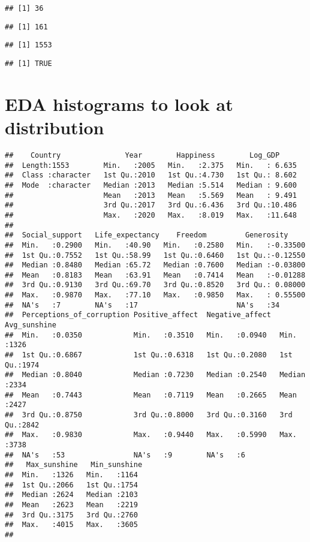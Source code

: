 \documentclass[
]{article}
\begin{document}
\begin{verbatim}
## [1] 36
\end{verbatim}

\begin{verbatim}
## [1] 161
\end{verbatim}

\begin{verbatim}
## [1] 1553
\end{verbatim}

\begin{verbatim}
## [1] TRUE
\end{verbatim}

\hypertarget{eda-histograms-to-look-at-distribution}{%
\section{EDA histograms to look at
distribution}\label{eda-histograms-to-look-at-distribution}}

\begin{verbatim}
##    Country               Year        Happiness        Log_GDP      
##  Length:1553        Min.   :2005   Min.   :2.375   Min.   : 6.635  
##  Class :character   1st Qu.:2010   1st Qu.:4.730   1st Qu.: 8.602  
##  Mode  :character   Median :2013   Median :5.514   Median : 9.600  
##                     Mean   :2013   Mean   :5.569   Mean   : 9.491  
##                     3rd Qu.:2017   3rd Qu.:6.436   3rd Qu.:10.486  
##                     Max.   :2020   Max.   :8.019   Max.   :11.648  
##                                                                    
##  Social_support   Life_expectancy    Freedom         Generosity      
##  Min.   :0.2900   Min.   :40.90   Min.   :0.2580   Min.   :-0.33500  
##  1st Qu.:0.7552   1st Qu.:58.99   1st Qu.:0.6460   1st Qu.:-0.12550  
##  Median :0.8480   Median :65.72   Median :0.7600   Median :-0.03800  
##  Mean   :0.8183   Mean   :63.91   Mean   :0.7414   Mean   :-0.01288  
##  3rd Qu.:0.9130   3rd Qu.:69.70   3rd Qu.:0.8520   3rd Qu.: 0.08000  
##  Max.   :0.9870   Max.   :77.10   Max.   :0.9850   Max.   : 0.55500  
##  NA's   :7        NA's   :17                       NA's   :34        
##  Perceptions_of_corruption Positive_affect  Negative_affect   Avg_sunshine 
##  Min.   :0.0350            Min.   :0.3510   Min.   :0.0940   Min.   :1326  
##  1st Qu.:0.6867            1st Qu.:0.6318   1st Qu.:0.2080   1st Qu.:1974  
##  Median :0.8040            Median :0.7230   Median :0.2540   Median :2334  
##  Mean   :0.7443            Mean   :0.7119   Mean   :0.2665   Mean   :2427  
##  3rd Qu.:0.8750            3rd Qu.:0.8000   3rd Qu.:0.3160   3rd Qu.:2842  
##  Max.   :0.9830            Max.   :0.9440   Max.   :0.5990   Max.   :3738  
##  NA's   :53                NA's   :9        NA's   :6                      
##   Max_sunshine   Min_sunshine 
##  Min.   :1326   Min.   :1164  
##  1st Qu.:2066   1st Qu.:1754  
##  Median :2624   Median :2103  
##  Mean   :2623   Mean   :2219  
##  3rd Qu.:3175   3rd Qu.:2760  
##  Max.   :4015   Max.   :3605  
## 
\end{verbatim}
\end{document}
